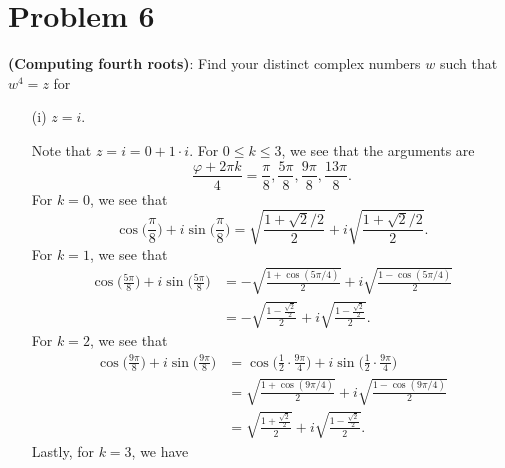 \documentclass[a4paper]{article}
\begin{document}
    \section*{Problem 6} \textbf{(Computing fourth roots)}: Find your distinct complex numbers \( w  \) such that \( w^{4} = z  \) for 
        \begin{enumerate}
            \item[(i)] \( z = i  \).
                \begin{solution}
                Note that \( z  = i = 0  + 1 \cdot i  \). For \( 0 \leq k \leq 3   \), we see that the arguments are 
                \[  \frac{  \varphi + 2 \pi k  }{ 4  }  = \frac{ \pi }{ 8 }, \frac{ 5 \pi  }{ 8  }, \frac{ 9 \pi  }{ 8  }, \frac{  13 \pi  }{ 8  }.   \]
                For \( k = 0  \), we see that 
                \[    \cos \Big(  \frac{  \pi   }{ 8 }   \Big) + i \sin \Big(  \frac{ \pi  }{ 8  }  \Big) = \sqrt{ \frac{ 1 + \sqrt{ 2 } / 2  }{ 2  }  } + i \sqrt{ \frac{  1 + \sqrt{ 2 } / 2  }{ 2  } }. \]
            For \(  k = 1  \), we see that 
            \begin{align*}
            \cos \Big( \frac{ 5 \pi  }{ 8  } \Big) + i \sin \Big( \frac{ 5 \pi  }{ 8  }  \Big) &= - \sqrt{ \frac{ 1 + \cos(5 \pi /4) }{ 2  }  } + i \sqrt{ \frac{ 1 - \cos (5 \pi /4) }{ 2 }  }     \\
                                                                                               &= - \sqrt{ \frac{ 1 - \frac{ \sqrt{ 2 }  }{ 2 }   }{ 2 }  } + i \sqrt{ \frac{ 1 - \frac{ \sqrt{ 2 }  }{ 2 }   }{ 2 }  }. 
        \end{align*}
        For \( k = 2  \), we see that 
        \begin{align*}
            \cos \Big(  \frac{  9 \pi  }{ 8  }  \Big) + i \sin \Big(  \frac{ 9 \pi  }{ 8  }  \Big) &= \cos \Big(  \frac{ 1 }{ 2 }  \cdot \frac{  9 \pi  }{ 4  }  \Big) + i \sin \Big(  \frac{ 1 }{ 2 }  \cdot \frac{ 9 \pi  }{ 4 }  \Big) \\
                                                                                                   &= \sqrt{ \frac{ 1 + \cos(9 \pi /4) }{2  }  }  + i \sqrt{ \frac{ 1 - \cos(9\pi/4) }{ 2  }  } \\
                                                                                                   &= \sqrt{  \frac{ 1 + \frac{ \sqrt{ 2 }  }{ 2 }  }{ 2 }     } + i \sqrt{  \frac{ 1 - \frac{ \sqrt{ 2 }  }{ 2 }  }{ 2 }  }. 
        \end{align*}
        Lastly, for \( k =3  \), we have 

\end{solution}
\end{enumerate}
\end{document}
